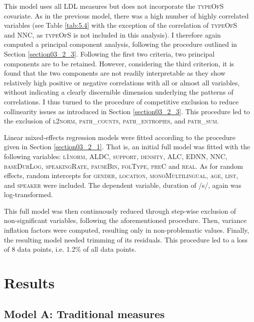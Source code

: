 This model uses all LDL measures but does not incorporate the \textsc{typeOfS} covariate. As in the previous model, there was a high number of highly correlated variables (see Table \ref{tab:5.4} with the exception of the correlation of \textsc{typeOfS} and \textsc{NNC}, as \textsc{typeOfS} is not included in this analysis). I therefore again computed a principal component analysis, following the procedure outlined in Section \ref{section03_2_3}. Following the first two criteria, two principal components are to be retained. However, considering the third criterion, it is found that the two components are not readily interpretable as they show relatively high positive or negative correlations with all or almost all variables, without indicating a clearly discernible dimension underlying the patterns of correlations. I thus turned to the procedure of competitive exclusion to reduce collinearity issues as introduced in Section \ref{section03_2_3}. This procedure led to the exclusion of \textsc{l2norm}, \textsc{path\_counts}, \textsc{path\_entropies}, and \textsc{path\_sum}.

Linear mixed-effects regression models were fitted according to the procedure given in Section \ref{section03_2_1}. That is, an initial full model was fitted with the following variables: \textsc{l1norm}, \textsc{ALDC}, \textsc{support}, \textsc{density}, \textsc{ALC}, \textsc{EDNN}, \textsc{NNC}, \textsc{baseDurLog}, \textsc{speakingRate}, \textsc{pauseBin}, \textsc{folType}, \textsc{preC} and \textsc{real}. As for random effects, random intercepts for \textsc{gender}, \textsc{location}, \textsc{monoMultilingual}, \textsc{age}, \textsc{list}, and \textsc{speaker} were included. The dependent variable, duration of /s/, again was log-transformed.

This full model was then continuously reduced through step-wise exclusion of non-significant variables, following the aforementioned procedure. Then, variance inflation factors were computed, resulting only in non-problematic values. Finally, the resulting model needed trimming of its residuals. This procedure led to a loss of 8 data points, i.e. 1.2\% of all data points.

\section{Results}\label{section05_3}

\subsection{Model A: Traditional measures}\label{section05_3_1}

